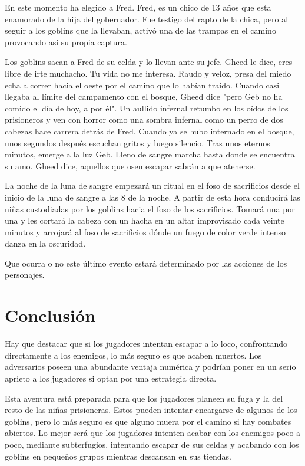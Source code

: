 \documentclass[10pt,twoside,twocolumn,openany]{dndbook}
\begin{document}
En este momento ha elegido a Fred. Fred, es un chico de 13 años que esta enamorado de la hija del gobernador. Fue testigo del rapto de la chica, pero al seguir a los goblins que la llevaban, activó una de las trampas en el camino provocando así su propia captura.

\begin{DndReadAloud}
Los goblins sacan a Fred de su celda y lo llevan ante su jefe. Gheed le dice, eres libre de irte muchacho. Tu vida no me interesa. Raudo y veloz, presa del miedo echa a correr hacia el oeste por el camino que lo habían traido. Cuando casi llegaba al límite del campamento con el bosque, Gheed dice "pero Geb no ha comido el día de hoy, a por él". Un aullido infernal retumbo en los oídos de los prisioneros y ven con horror como una sombra infernal como un perro de dos cabezas hace carrera detrás de Fred. Cuando ya se hubo internado en el bosque, unos segundos después escuchan gritos y luego silencio. Tras unos eternos minutos, emerge a la luz Geb. Lleno de sangre marcha hasta donde se encuentra su amo. Gheed dice, aquellos que osen escapar sabrán a que atenerse.
\end{DndReadAloud}

La noche de la luna de sangre empezará un ritual en el foso de sacrificios desde el inicio de la luna de sangre a las 8 de la noche. A partir de esta hora conducirá las niñas custodiadas por los goblins hacia el foso de los sacrificios. Tomará una por una y les cortará la cabeza con un hacha en un altar improvisado cada veinte minutos y arrojará al foso de sacrificios dónde un fuego de color verde intenso danza en la oscuridad.

Que ocurra o no este último evento estará determinado por las acciones de los personajes.


\section{Conclusión}

Hay que destacar que si los jugadores intentan escapar a lo loco, confrontando directamente a los enemigos, lo más seguro es que acaben muertos. Los adversarios poseen una abundante ventaja numérica y podrían poner en un serio aprieto a los jugadores si optan por una estrategia directa.

Esta aventura está preparada para que los jugadores planeen su fuga y la del resto de las niñas prisioneras. Estos pueden intentar encargarse de algunos de los goblins, pero lo más seguro es que alguno muera por el camino si hay combates abiertos. Lo mejor será que los jugadores intenten acabar con los enemigos poco a poco, mediante subterfugios, intentando escapar de sus celdas y acabando con los goblins en pequeños grupos mientras descansan en sus tiendas.
\end{document}
